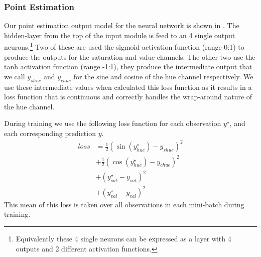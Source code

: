 \documentclass[11pt,a4paper]{article}
\begin{document}
\subsubsection{Point Estimation}\label{sec:point-estimation}
Our point estimation output model for the neural network is shown in .
The hidden-layer from the top of the input module is feed to an 4 single output neurons.\footnote{Equivalently these 4 single neurons can be expressed as a layer with 4 outputs and 2 different activation functions.}
Two of these are used the sigmoid activation function (range 0:1) to produce the outputs for the saturation and value channels.
The other two use the tanh activation function (range -1:1), they produce the intermediate output that we call $y_{shue}$ and $y_{chue}$ for the sine and cosine of the hue channel respectively.
We use these intermediate values when calculated this loss function as it results in a loss function that is continuous and correctly handles the wrap-around nature of the hue channel.

During training we use the following loss function for each observation $y^\star$, and each corresponding prediction $y$.
\begin{align}
loss &= %
\frac{1}{2} \left(\sin(y^\star_{hue}) - y_{shue} \right)^2     \nonumber \\
&+ \frac{1}{2} \left(\cos(y^\star_{hue}) - y_{chue} \right)^2  \nonumber \\
&+ \left(y^\star_{sat} - y_{sat} \right)^2  \nonumber \\
&+ \left(y^\star_{val} - y_{val} \right)^2 %
\end{align}
This mean of this loss is taken over all observations in each mini-batch during training.
\end{document}
